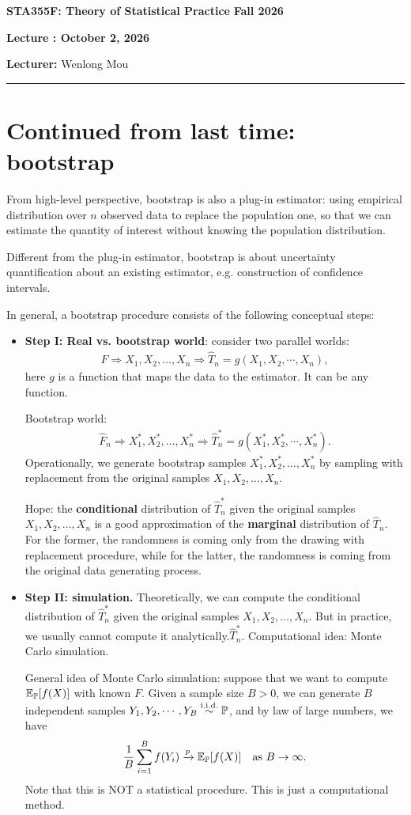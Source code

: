 \documentclass[11pt,letterpaper]{article}
\newcommand{\coursenumber}{STA355F}
\newcommand{\coursetitle}{Theory of Statistical Practice}
\newcommand{\courseterm}{Fall 2026}
\newcounter{lecture}
\newcommand{\lecturenumber}{\arabic{lecture}}
\newcommand{\lecturedate}{October 2, 2026}
\newcommand{\lecturer}{Wenlong Mou}
\numberwithin{assumption}{lecture}
\numberwithin{theorem}{lecture}
\numberwithin{proposition}{lecture}
\numberwithin{lemma}{lecture}
\numberwithin{claim}{lecture}
\numberwithin{corollary}{lecture}
\numberwithin{definition}{lecture}
\numberwithin{conjecture}{lecture}
\numberwithin{remark}{lecture}
\numberwithin{example}{lecture}
\numberwithin{equation}{lecture}
\newcommand{\makelecturenotesheader}{%
  \noindent
  \textbf{\coursenumber: \coursetitle}%
  \hfill
  \textbf{\courseterm}

  \begin{center}
    {\Large\bfseries Lecture \lecturenumber: \lecturedate}
  \end{center}

  \noindent
  \textbf{Lecturer:} \lecturer
  \par\medskip
  \hrule
  \bigskip
}
\begin{document}
\makelecturenotesheader

\section{Continued from last time: bootstrap}
From high-level perspective, bootstrap is also a plug-in estimator: using empirical distribution over $n$ observed data to replace the population one, so that we can estimate the quantity of interest without knowing the population distribution.

Different from the plug-in estimator, bootstrap is about uncertainty quantification about an existing estimator, e.g. construction of confidence intervals.

In general, a bootstrap procedure consists of the following conceptual steps:
\begin{itemize}
  \item \textbf{Step I: Real vs. bootstrap world}: consider two parallel worlds:
  \begin{align*}
    F \Rightarrow X_1, X_2, \ldots, X_n \Rightarrow \widehat{T}_n = g (X_1, X_2, \cdots, X_n),
  \end{align*}
  here $g$ is a function that maps the data to the estimator. It can be any function.

  Bootstrap world:
  \begin{align*}
    \widehat{F}_n \Rightarrow X_1^*, X_2^*, \ldots, X_n^* \Rightarrow \widehat{T}_n^* = g (X_1^*, X_2^*, \cdots, X_n^*).
  \end{align*}
  Operationally, we generate bootstrap samples $X_1^*, X_2^*, \ldots, X_n^*$ by sampling with replacement from the original samples $X_1, X_2, \ldots, X_n$.

  Hope: the {\color{red}\textbf{conditional}} distribution of $\widehat{T}_n^*$ given the original samples $X_1, X_2, \ldots, X_n$ is a good approximation of the {\color{red}\textbf{marginal} }distribution of $\widehat{T}_n$. For the former, the randomness is coming only from the drawing with replacement procedure, while for the latter, the randomness is coming from the original data generating process.
  \item \textbf{Step II: simulation.} Theoretically, we can compute the conditional distribution of $\widehat{T}_n^*$ given the original samples $X_1, X_2, \ldots, X_n$. But in practice, we usually cannot compute it analytically.$\widehat{T}_n^*$. Computational idea: Monte Carlo simulation.

  {\color{blue}
  General idea of Monte Carlo simulation: suppose that we want to compute ${\mathbb{E}}_{{\mathbb{P}}} [f (X)]$ with known $F$. Given a sample size $B > 0$, we can generate $B$ independent samples $Y_1, Y_2, \cdots, Y_B \overset{\mathrm{i.i.d.}}{\sim} {\mathbb{P}}$, and by law of large numbers, we have
  \begin{align*}
    \frac{1}{B} \sum_{i=1}^B f (Y_i) \xrightarrow{p} {\mathbb{E}}_{{\mathbb{P}}} [f (X)] \quad \text{as } B \to \infty.
  \end{align*}
  Note that this is NOT a statistical procedure. This is just a computational method.
  }


\end{itemize}
\end{document}
